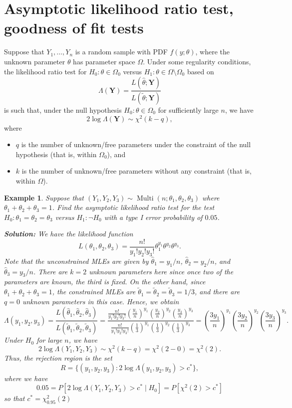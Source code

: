 \documentclass[10pt]{article}
\DeclareMathOperator{\Multi}{Multi}
\theoremstyle{newstyle}
\newtheorem{exmp}[thm]{Example}
\begin{document}
\newpage
\section{Asymptotic likelihood ratio test, goodness of fit tests}

Suppose that $Y_1, \dots, Y_n$ is a random sample with PDF $f(y; \theta)$, where 
the unknown parameter $\theta$ has parameter space $\Omega$. Under some regularity conditions, the 
likelihood ratio test for $H_0 : \theta \in \Omega_0$ versus $H_1 : \theta \in \Omega \setminus 
\Omega_0$ based on 
\[ \Lambda(\mathbf Y) = \frac{L(\hat\theta; \mathbf Y)}{L(\tilde\theta; \mathbf Y)} \]
is such that, under the null hypothesis $H_0 : \theta \in \Omega_0$ for sufficiently large $n$, we have 
\[ 2 \log \Lambda(\mathbf Y) \sim \chi^2(k-q), \]
where 
\begin{itemize}
    \item $q$ is the number of unknown/free parameters under the constraint of the null hypothesis 
    (that is, within $\Omega_0$), and 
    \item $k$ is the number of unknown/free parameters without any constraint 
    (that is, within $\Omega$).
\end{itemize}

\begin{exmp}
Suppose that $(Y_1, Y_2, Y_3) \sim \Multi(n; \theta_1, \theta_2, \theta_3)$ where 
$\theta_1 + \theta_2 + \theta_3 = 1$. Find the asymptotic likelihood ratio test for the 
test $H_0 : \theta_1 = \theta_2 = \theta_3$ versus $H_1 : \neg H_0$ with a type I error 
probability of $0.05$. 

{\color{blue}
{\bf Solution:} 
We have the likelihood function 
\[ L(\theta_1, \theta_2, \theta_3) = \frac{n!}{y_1!y_2!y_3!} \theta_1^{y_1} \theta^{y_2} \theta^{y_3}. \]
Note that the unconstrained MLEs are given by $\hat\theta_1 = y_1/n$, $\hat\theta_2 = y_2/n$, and 
$\hat\theta_3 = y_3/n$. There are $k = 2$ unknown parameters here since once two of the parameters are 
known, the third is fixed. On the other hand, since $\theta_1 + \theta_2 + \theta_3 = 1$, the 
constrained MLEs are $\tilde\theta_1 = \tilde\theta_2 = \tilde\theta_3 = 1/3$, and there are 
$q = 0$ unknown parameters in this case. Hence, we obtain 
\[ \Lambda(y_1, y_2, y_3) = 
\frac{L(\hat\theta_1, \hat\theta_2, \hat\theta_3)}{L(\tilde\theta_1, \tilde\theta_2, \tilde\theta_3)} 
= \frac{ \frac{n!}{y_1!y_2!y_3!} (\frac{y_1}n)^{y_1} (\frac{y_2}n)^{y_2} (\frac{y_3}n)^{y_3} }
{ \frac{n!}{y_1!y_2!y_3!} (\frac13)^{y_1} (\frac13)^{y_2} (\frac13)^{y_3} } 
= \left( \frac{3y_1}n \right)^{y_1} \left( \frac{3y_2}n \right)^{y_2} \left( \frac{3y_3}n \right)^{y_3}. \]
Under $H_0$ for large $n$, we have 
\[ 2 \log\Lambda(Y_1, Y_2, Y_3) \sim \chi^2(k-q) = \chi^2(2-0) = \chi^2(2). \]
Thus, the rejection region is the set 
\[ R = \{(y_1, y_2, y_3) : 2 \log\Lambda(y_1, y_2, y_3) > c^*\}, \] 
where we have 
\[ 0.05 = P[2\log\Lambda(Y_1, Y_2, Y_3) > c^* \mid H_0] = P[\chi^2(2) > c^*] \]
so that $c^* = \chi^2_{0.95}(2)$}
\end{exmp}
\end{document}
